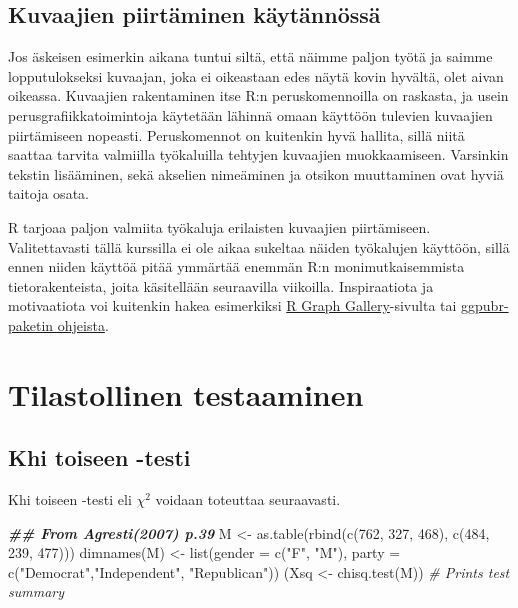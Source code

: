 \documentclass[
]{book}
\newenvironment{Shaded}{\begin{snugshade}}{\end{snugshade}}
\newcommand{\AttributeTok}[1]{\textcolor[rgb]{0.77,0.63,0.00}{#1}}
\newcommand{\CommentTok}[1]{\textcolor[rgb]{0.56,0.35,0.01}{\textit{#1}}}
\newcommand{\DecValTok}[1]{\textcolor[rgb]{0.00,0.00,0.81}{#1}}
\newcommand{\DocumentationTok}[1]{\textcolor[rgb]{0.56,0.35,0.01}{\textbf{\textit{#1}}}}
\newcommand{\FunctionTok}[1]{\textcolor[rgb]{0.00,0.00,0.00}{#1}}
\newcommand{\NormalTok}[1]{#1}
\newcommand{\OtherTok}[1]{\textcolor[rgb]{0.56,0.35,0.01}{#1}}
\newcommand{\StringTok}[1]{\textcolor[rgb]{0.31,0.60,0.02}{#1}}
\begin{document}
\hypertarget{kuvaajien-piirtuxe4minen-kuxe4ytuxe4nnuxf6ssuxe4}{%
\section{Kuvaajien piirtäminen käytännössä}\label{kuvaajien-piirtuxe4minen-kuxe4ytuxe4nnuxf6ssuxe4}}

Jos äskeisen esimerkin aikana tuntui siltä, että näimme paljon työtä ja saimme lopputulokseksi kuvaajan, joka ei oikeastaan edes näytä kovin hyvältä, olet aivan oikeassa. Kuvaajien rakentaminen itse R:n peruskomennoilla on raskasta, ja usein perusgrafiikkatoimintoja käytetään lähinnä omaan käyttöön tulevien kuvaajien piirtämiseen nopeasti. Peruskomennot on kuitenkin hyvä hallita, sillä niitä saattaa tarvita valmiilla työkaluilla tehtyjen kuvaajien muokkaamiseen. Varsinkin tekstin lisääminen, sekä akselien nimeäminen ja otsikon muuttaminen ovat hyviä taitoja osata.

R tarjoaa paljon valmiita työkaluja erilaisten kuvaajien piirtämiseen. Valitettavasti tällä kurssilla ei ole aikaa sukeltaa näiden työkalujen käyttöön, sillä ennen niiden käyttöä pitää ymmärtää enemmän R:n monimutkaisemmista tietorakenteista, joita käsitellään seuraavilla viikoilla. Inspiraatiota ja motivaatiota voi kuitenkin hakea esimerkiksi \href{https://www.r-graph-gallery.com/index.html}{R Graph Gallery}-sivulta tai \href{https://rpkgs.datanovia.com/ggpubr/index.html}{ggpubr-paketin ohjeista}.

\hypertarget{tests}{%
\chapter{Tilastollinen testaaminen}\label{tests}}

\hypertarget{chi-squared-test}{%
\section{Khi toiseen -testi}\label{chi-squared-test}}

Khi toiseen -testi eli \(\chi^2\) voidaan toteuttaa seuraavasti.

\begin{Shaded}
\begin{Highlighting}[]
\DocumentationTok{\#\# From Agresti(2007) p.39}
\NormalTok{M }\OtherTok{\textless{}{-}} \FunctionTok{as.table}\NormalTok{(}\FunctionTok{rbind}\NormalTok{(}\FunctionTok{c}\NormalTok{(}\DecValTok{762}\NormalTok{, }\DecValTok{327}\NormalTok{, }\DecValTok{468}\NormalTok{), }\FunctionTok{c}\NormalTok{(}\DecValTok{484}\NormalTok{, }\DecValTok{239}\NormalTok{, }\DecValTok{477}\NormalTok{)))}
\FunctionTok{dimnames}\NormalTok{(M) }\OtherTok{\textless{}{-}} \FunctionTok{list}\NormalTok{(}\AttributeTok{gender =} \FunctionTok{c}\NormalTok{(}\StringTok{"F"}\NormalTok{, }\StringTok{"M"}\NormalTok{),}
                    \AttributeTok{party =} \FunctionTok{c}\NormalTok{(}\StringTok{"Democrat"}\NormalTok{,}\StringTok{"Independent"}\NormalTok{, }\StringTok{"Republican"}\NormalTok{))}
\NormalTok{(Xsq }\OtherTok{\textless{}{-}} \FunctionTok{chisq.test}\NormalTok{(M))  }\CommentTok{\# Prints test summary}
\end{Highlighting}
\end{Shaded}
\end{document}
